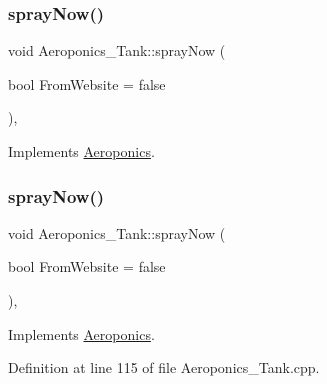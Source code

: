 \subsubsection{\texorpdfstring{spray\+Now()}{sprayNow()}\hspace{0.1cm}{\footnotesize\ttfamily [1/2]}}
{\footnotesize\ttfamily void Aeroponics\+\_\+\+Tank\+::spray\+Now (\begin{DoxyParamCaption}\item[{bool}]{From\+Website = {\ttfamily false} }\end{DoxyParamCaption})\hspace{0.3cm}{\ttfamily [protected]}, {\ttfamily [virtual]}}



Implements \hyperlink{class_aeroponics_aecda76aae20ce45fd9a080770cf07e56}{Aeroponics}.

\mbox{\label{class_aeroponics___tank_ab4158b1a54f6a1ac4f3eb35fc8854e35}} 
\subsubsection{\texorpdfstring{spray\+Now()}{sprayNow()}\hspace{0.1cm}{\footnotesize\ttfamily [2/2]}}
{\footnotesize\ttfamily void Aeroponics\+\_\+\+Tank\+::spray\+Now (\begin{DoxyParamCaption}\item[{bool}]{From\+Website = {\ttfamily false} }\end{DoxyParamCaption})\hspace{0.3cm}{\ttfamily [protected]}, {\ttfamily [virtual]}}



Implements \hyperlink{class_aeroponics_aecda76aae20ce45fd9a080770cf07e56}{Aeroponics}.



Definition at line 115 of file Aeroponics\+\_\+\+Tank.\+cpp.


